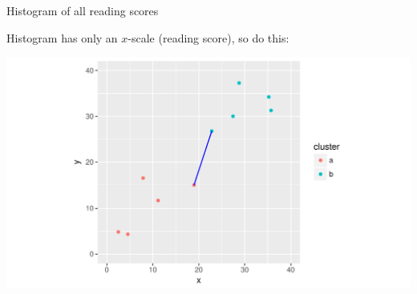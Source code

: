 \begin{frame}[fragile]{Histogram of all reading scores}
  
Histogram has only an $x$-scale (reading score), so do this:

\begin{knitrout}
\color{fgcolor}\begin{kframe}
\begin{alltt}
\hlstd{(}\hlopt{+}
  \hlstd{()}
\end{alltt}


{\ttfamily\noindent\itshape\color{messagecolor}{\#\# `stat\_bin()` using `bins = 30`. Pick better value with `binwidth`.}}\end{kframe}
\includegraphics[width=\maxwidth]{figure/unnamed-chunk-3-1} 

\end{knitrout}
  
\end{frame}

